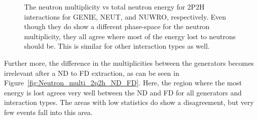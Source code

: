 \documentclass[12pt]{article}
\begin{document}
\begin{figure}
\begin{subfigure}[b]{0.32\textwidth}
\end{subfigure}
\caption{The neutron multiplicity vs total neutron energy for 2P2H interactions for GENIE, NEUT, and NUWRO, respectively.  Even though they do show a different phase-space for the neutron multiplicity, they all agree where most of the energy lost to neutrons should be.  This is similar for other interaction types as well.}
\label{fig:Neutron_multi_2p2h_ND}
\end{figure}
Further more, the difference in the multiplicities between the generators becomes irrelevant after a ND to FD extraction, as can be seen in Figure~\ref{fig:Neutron_multi_2p2h_ND_FD}.
Here, the region where the most energy is lost agrees very well between the ND and FD for all generators and interaction types.
The areas with low statistics do show a disagreement, but very few events fall into this area.
\end{document}
